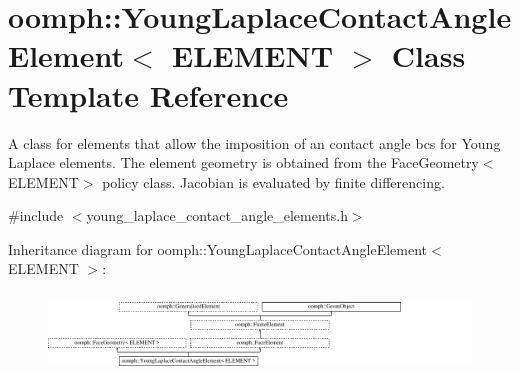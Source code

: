 \hypertarget{classoomph_1_1YoungLaplaceContactAngleElement}{}\section{oomph\+:\+:Young\+Laplace\+Contact\+Angle\+Element$<$ E\+L\+E\+M\+E\+NT $>$ Class Template Reference}
\label{classoomph_1_1YoungLaplaceContactAngleElement}


A class for elements that allow the imposition of an contact angle bcs for Young Laplace elements. The element geometry is obtained from the Face\+Geometry$<$\+E\+L\+E\+M\+E\+N\+T$>$ policy class. Jacobian is evaluated by finite differencing.  




{\ttfamily \#include $<$young\+\_\+laplace\+\_\+contact\+\_\+angle\+\_\+elements.\+h$>$}

Inheritance diagram for oomph\+:\+:Young\+Laplace\+Contact\+Angle\+Element$<$ E\+L\+E\+M\+E\+NT $>$\+:\begin{figure}[H]
\begin{center}
\leavevmode
\includegraphics[height=2.151777cm]{classoomph_1_1YoungLaplaceContactAngleElement}
\end{center}
\end{figure}
